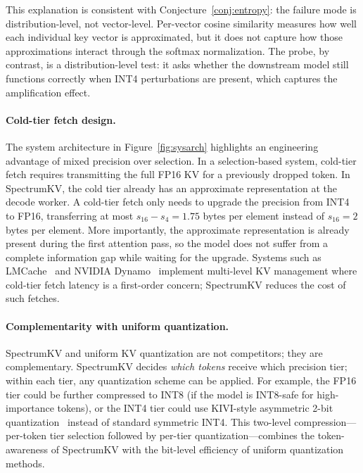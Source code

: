\documentclass[11pt]{article}
\newcommand{\method}{SpectrumKV}
\theoremstyle{plain}
\theoremstyle{definition}
\begin{document}
This explanation is consistent with Conjecture~\ref{conj:entropy}: the failure mode is distribution-level, not vector-level.  Per-vector cosine similarity measures how well each individual key vector is approximated, but it does not capture how those approximations interact through the softmax normalization.  The probe, by contrast, is a distribution-level test: it asks whether the downstream model still functions correctly when INT4 perturbations are present, which captures the amplification effect.

\paragraph{Cold-tier fetch design.}
The system architecture in Figure~\ref{fig:sysarch} highlights an engineering advantage of mixed precision over selection.  In a selection-based system, cold-tier fetch requires transmitting the full FP16 KV for a previously dropped token.  In \method{}, the cold tier already has an approximate representation at the decode worker.  A cold-tier fetch only needs to upgrade the precision from INT4 to FP16, transferring at most $s_{16} - s_4 = 1.75$ bytes per element instead of $s_{16} = 2$ bytes per element.  More importantly, the approximate representation is already present during the first attention pass, so the model does not suffer from a complete information gap while waiting for the upgrade.  Systems such as LMCache~\citep{lmcache} and NVIDIA Dynamo~\citep{nvidiadynamo} implement multi-level KV management where cold-tier fetch latency is a first-order concern; \method{} reduces the cost of such fetches.

\paragraph{Complementarity with uniform quantization.}
\method{} and uniform KV quantization are not competitors; they are complementary.  \method{} decides \emph{which tokens} receive which precision tier; within each tier, any quantization scheme can be applied.  For example, the FP16 tier could be further compressed to INT8 (if the model is INT8-safe for high-importance tokens), or the INT4 tier could use KIVI-style asymmetric 2-bit quantization~\citep{kivi} instead of standard symmetric INT4.  This two-level compression---per-token tier selection followed by per-tier quantization---combines the token-awareness of \method{} with the bit-level efficiency of uniform quantization methods.
\end{document}
